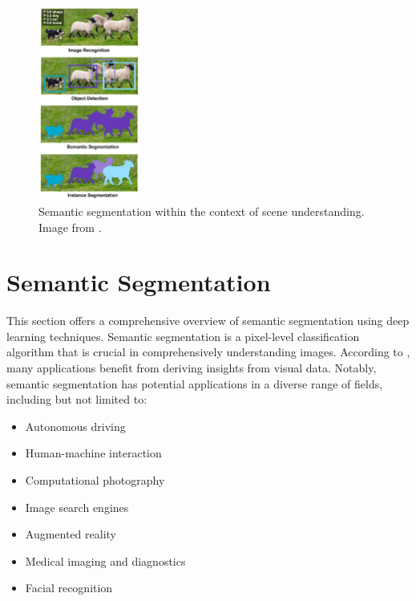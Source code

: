 \begin{figure}
    \centering
    \includegraphics[width=0.30\textwidth]{images/semanticInstance_v1.jpg}
    \captionsetup{width=0.3\textwidth}
    \caption[Scene understanding]{Semantic segmentation within the context of scene understanding. Image from \cite{Bright2020Nov}.}
    \label{semanticInstance}
    \vspace{-20pt}
\end{figure}
\section{Semantic Segmentation}
This section offers a comprehensive overview of semantic segmentation using deep learning techniques. Semantic segmentation is a pixel-level classification algorithm that is crucial in comprehensively understanding images. According to \cite{GARCIAGARCIA201841}, many applications benefit from deriving insights from visual data. Notably, semantic segmentation has potential applications in a diverse range of fields, including but not limited to:

\begin{itemize}[noitemsep]
    \item Autonomous driving \cite{ess2009segmentation} \cite{feng2020deep} \cite{treml2016speeding} \cite{siam2018comparative} \cite{blum2019fishyscapes}
    \item Human-machine interaction \cite{oberweger2015hands}
    \item Computational photography \cite{yoon2015learning}
    \item Image search engines \cite{wan2014deep}
    \item Augmented reality \cite{ko2020novel} \cite{zhang2020slimmer}
    \item Medical imaging and diagnostics \cite{asgari2021deep} \cite{khan2021deep} \cite{du2020medical}
    \item Facial recognition \cite{meenpal2019facial} \cite{khan2015multi}
\end{itemize}

